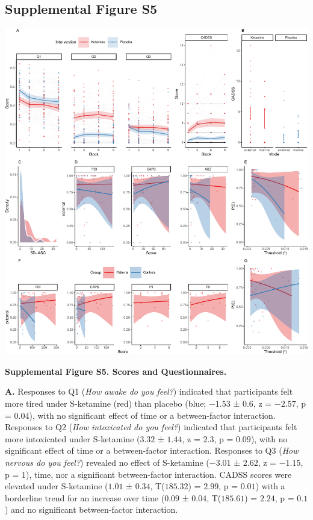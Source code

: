 \documentclass[
]{article}
\begin{document}
\newpage

\hypertarget{supplemental-figure-s5}{%
\subsection{Supplemental Figure S5}\label{supplemental-figure-s5}}

\includegraphics{modes_ketamine_scz_files/figure-latex/Supplemental_Figure_S5-1.pdf}

\textbf{Supplemental Figure S5. Scores and Questionnaires.}

\textbf{A.} Responses to Q1 (\emph{How awake do you feel?}) indicated
that participants felt more tired under S-ketamine (red) than placebo
(blue; \(-1.53\) ± \(0.6\), z = \(-2.57\), p = \(0.04\)), with no
significant effect of time or a between-factor interaction. Responses to
Q2 (\emph{How intoxicated do you feel?}) indicated that participants
felt more intoxicated under S-ketamine (\(3.32\) ± \(1.44\), z =
\(2.3\), p = \(0.09\)), with no significant effect of time or a
between-factor interaction. Responses to Q3 (\emph{How nervous do you
feel?}) revealed no effect of S-ketamine (\(-3.01\) ± \(2.62\), z =
\(-1.15\), p = \(1\)), time, nor a significant between-factor
interaction. CADSS scores were elevated under S-ketamine (\(1.01\) ±
\(0.34\), T(\(185.32\)) = \(2.99\), p = \(0.01\)) with a borderline
trend for an increase over time (\(0.09\) ± \(0.04\), T(\(185.61\)) =
\(2.24\), p = \(0.1\)) and no significant between-factor interaction.
\end{document}
